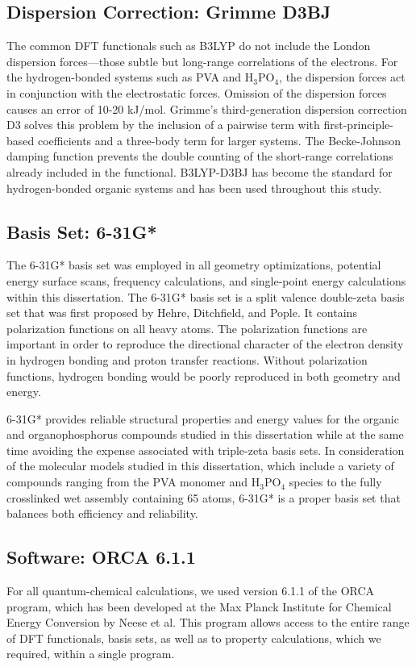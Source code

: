 \documentclass[12pt,a4paper]{report}
\begin{document}
\subsection{Dispersion Correction: Grimme D3BJ}
The common DFT functionals such as B3LYP do not include the London dispersion forces—those subtle but long-range correlations of the electrons. For the hydrogen-bonded systems such as PVA and H\(_3\)PO\(_4\), the dispersion forces act in conjunction with the electrostatic forces. Omission of the dispersion forces causes an error of 10-20 kJ/mol. \cite{74} Grimme’s third-generation dispersion correction D3 solves this problem by the inclusion of a pairwise term with first-principle-based coefficients and a three-body term for larger systems.\cite{74} The Becke-Johnson damping function prevents the double counting of the short-range correlations already included in the functional.\cite{75} B3LYP-D3BJ has become the standard for hydrogen-bonded organic systems and has been used throughout this study.

\subsection{Basis Set: 6-31G*}
The 6-31G* basis set was employed in all geometry optimizations, potential energy surface scans, frequency calculations, and single-point energy calculations within this dissertation.\cite{76} The 6-31G* basis set is a split valence double-zeta basis set that was first proposed by Hehre, Ditchfield, and Pople. It contains polarization functions on all heavy atoms. The polarization functions are important in order to reproduce the directional character of the electron density in hydrogen bonding and proton transfer reactions.\cite{76} Without polarization functions, hydrogen bonding would be poorly reproduced in both geometry and energy.

6-31G* provides reliable structural properties and energy values for the organic and organophosphorus compounds studied in this dissertation while at the same time avoiding the expense associated with triple-zeta basis sets. In consideration of the molecular models studied in this dissertation, which include a variety of compounds ranging from the PVA monomer and H\(_3\)PO\(_4\) species to the fully crosslinked wet assembly containing 65 atoms, 6-31G* is a proper basis set that balances both efficiency and reliability.

\subsection{Software: ORCA 6.1.1}
For all quantum-chemical calculations, we used version 6.1.1 of the ORCA program, which has been developed at the Max Planck Institute for Chemical Energy Conversion by Neese et al.\cite{77,78,79} This program allows access to the entire range of DFT functionals, basis sets, as well as to property calculations, which we required, within a single program.
\end{document}
